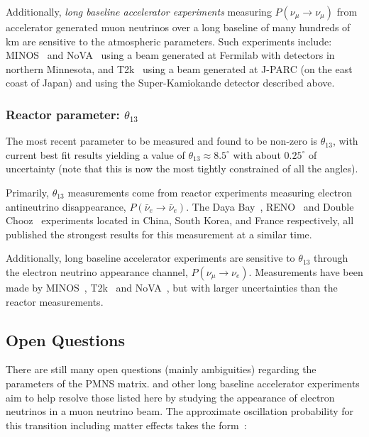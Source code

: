 Additionally, \emph{long baseline accelerator experiments} measuring
$P(\nu_{\mu}\rightarrow\nu_{\mu})$ from accelerator generated muon neutrinos over a long baseline
of many hundreds of km are sensitive to the atmospheric parameters. Such experiments include:
MINOS~\cite{adamson2013_1,adamson2013_2} and NoVA~\cite{acero2019,himmel2020} using a beam
generated at Fermilab with detectors in northern Minnesota, and T2k~\cite{dunne2020} using a beam
generated at J-PARC (on the east coast of Japan) and using the Super-Kamiokande detector described
above.

\subsubsection*{Reactor parameter: $\theta_{13}$} %

The most recent parameter to be measured and found to be non-zero is $\theta_{13}$, with current
best fit results yielding a value of $\theta_{13}\approx8.5^{\circ}$ with about $0.25^{\circ}$ of
uncertainty (note that this is now the most tightly constrained of all the angles).

Primarily, $\theta_{13}$ measurements come from reactor experiments measuring electron
antineutrino disappearance, $P(\bar{\nu}_{e}\rightarrow\bar{\nu}_{e})$. The Daya
Bay~\cite{an2012,an2017}, RENO~\cite{ahn2012,bak2018} and Double Chooz~\cite{abe2012} experiments
located in China, South Korea, and France respectively, all published the strongest results for
this measurement at a similar time.

Additionally, long baseline accelerator experiments are sensitive to $\theta_{13}$ through the
electron neutrino appearance channel, $P(\nu_{\mu}\rightarrow\nu_{e})$. Measurements have been
made by MINOS~\cite{adamson2013_3}, T2k~\cite{abe2013} and NoVA~\cite{adamson2016_2}, but with
larger uncertainties than the reactor measurements.

\subsection{Open Questions} %
\label{sec:theory_status_open} %

There are still many open questions (mainly ambiguities) regarding the parameters of the PMNS
matrix. \chips and other long baseline accelerator experiments aim to help resolve those listed
here by studying the appearance of electron neutrinos in a muon neutrino beam. The approximate
oscillation probability for this transition including matter effects takes the
form~\cite{particle2020}:

